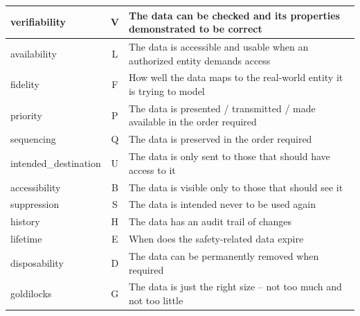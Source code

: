 \begin{longtable}{|L{}|C{}|L{}|}
	{\Gls{verifiability}} & V & {The data can be checked and its properties demonstrated to be correct}\\\hline
	{\Gls{availability}} & L & {The data is accessible and usable when an authorized entity demands access}\\\hline
	{\Gls{fidelity}} & F & {How well the data maps to the real-world entity it is trying to model}\\\hline
	{\Gls{priority}} & P & {The data is presented / transmitted / made available in the order required}\\\hline
	{\Gls{sequencing}} & Q & {The data is preserved in the order required}\\\hline
	{\Gls{intended_destination}} & U & {The data is only sent to those that should have access to it}\\\hline
	{\Gls{accessibility}} & B & {The data is visible only to those that should see it}\\\hline
	{\Gls{suppression}} & S & {The data is intended never to be used again}\\\hline
	{\Gls{history}} & H & {The data has an audit trail of changes}\\\hline
	{\Gls{lifetime}} & E & {When does the safety-related data expire}\\\hline
	{\Gls{disposability}} & D & {The data can be permanently removed when required}\\\hline
	{\Gls{goldilocks}} & G & {The data is just the right size -- not too much and not too little}\\\hline

\end{longtable}
